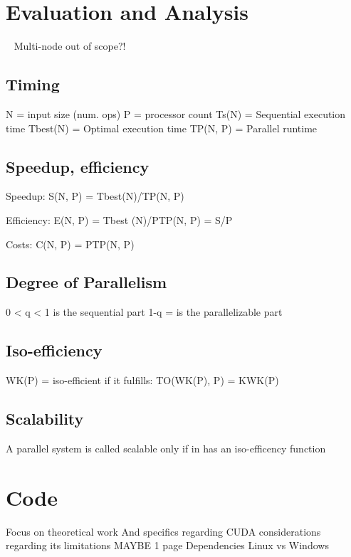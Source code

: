 \documentclass{article}
\begin{document}
\section{Evaluation and Analysis}~\cite[p.~330]{Lang17}
Multi-node out of scope?!
\subsection{Timing}
	N = input size (num. ops)
	P = processor count
	Ts(N) = Sequential execution time
	Tbest(N) = Optimal execution time
	TP(N, P) = Parallel runtime
\subsection{Speedup, efficiency}
	Speedup: 
S(N, P) = Tbest(N)/TP(N, P)

	Efficiency: 
E(N, P) = Tbest (N)/PTP(N, P) = S/P

	Costs: 
C(N, P) = PTP(N, P)
\subsection{Degree of Parallelism}
	0 < q < 1 is the sequential part
	1-q = is the parallelizable part
\subsection{Iso-efficiency}
	WK(P) = iso-efficient if it fulfills:
	TO(WK(P), P) = KWK(P)~\cite[p.~350]{Lang17}
\subsection{Scalability}
	A parallel system is called scalable only if in has an iso-efficency function
\section{Code}
Focus on theoretical work 
And specifics regarding CUDA considerations regarding its limitations
MAYBE 1 page
Dependencies
Linux vs Windows
\end{document}
